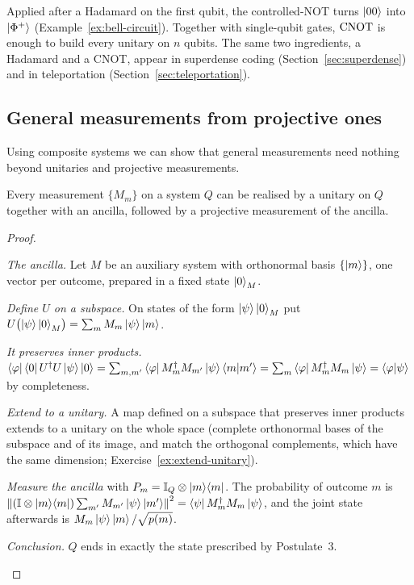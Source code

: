 \begin{lookahead}
  Applied after a Hadamard on the first qubit, the controlled-NOT turns $\left|00\right\rangle$ into $\left|\Phi^+\right\rangle$ (Example~\ref{ex:bell-circuit}). Together with single-qubit gates, $\mathrm{CNOT}$ is enough to build every unitary on $n$ qubits. The same two ingredients, a Hadamard and a CNOT, appear in superdense coding (Section~\ref{sec:superdense}) and in teleportation (Section~\ref{sec:teleportation}).
\end{lookahead}

\subsection{General measurements from projective ones}

Using composite systems we can show that general measurements need nothing beyond unitaries and projective measurements.

\begin{proposition}\label{prop:ancilla}
  Every measurement $\{M_m\}$ on a system $Q$ can be realised by a unitary on $Q$ together with an ancilla, followed by a projective measurement of the ancilla.
\end{proposition}
\begin{proof}
  \begin{steps}
    \item \emph{The ancilla.} Let $M$ be an auxiliary system with orthonormal basis $\{\left|m\right\rangle\}$, one vector per outcome, prepared in a fixed state $\left|0\right\rangle_M$.
    \item \emph{Define $U$ on a subspace.} On states of the form $\left|\psi\right\rangle\left|0\right\rangle_M$ put $U\bigl(\left|\psi\right\rangle\left|0\right\rangle_M\bigr)=\sum_mM_m\left|\psi\right\rangle\left|m\right\rangle$.
    \item \emph{It preserves inner products.} $\left\langle\varphi\right|\left\langle0\right|U^\dagger U\left|\psi\right\rangle\left|0\right\rangle=\sum_{m,m'}\left\langle\varphi\right| M_m^\dagger M_{m'}\left|\psi\right\rangle\left\langle m\middle|m'\right\rangle=\sum_m\left\langle\varphi\right| M_m^\dagger M_m\left|\psi\right\rangle=\left\langle\varphi\middle|\psi\right\rangle$ by completeness.
    \item \emph{Extend to a unitary.} A map defined on a subspace that preserves inner products extends to a unitary on the whole space (complete orthonormal bases of the subspace and of its image, and match the orthogonal complements, which have the same dimension; Exercise~\ref{ex:extend-unitary}).
    \item \emph{Measure the ancilla} with $P_m=\mathbb{I}_Q\otimes\left|m\right\rangle\!\left\langle m\right|$. The probability of outcome $m$ is $\left\|(\mathbb{I}\otimes\left|m\right\rangle\!\left\langle m\right|)\sum_{m'}M_{m'}\left|\psi\right\rangle\left|m'\right\rangle\right\|^2=\left\langle\psi\right| M_m^\dagger M_m\left|\psi\right\rangle$, and the joint state afterwards is $M_m\left|\psi\right\rangle\left|m\right\rangle/\sqrt{p(m)}$.
    \item \emph{Conclusion.} $Q$ ends in exactly the state prescribed by Postulate~3. \qedhere
  \end{steps}
\end{proof}


